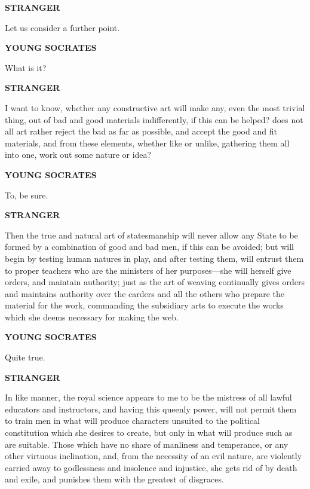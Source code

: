 \documentclass[11pt,letter]{article}
\begin{document}
\par \textbf{STRANGER}
\par   Let us consider a further point.

\par \textbf{YOUNG SOCRATES}
\par   What is it?

\par \textbf{STRANGER}
\par   I want to know, whether any constructive art will make any, even the most trivial thing, out of bad and good materials indifferently, if this can be helped? does not all art rather reject the bad as far as possible, and accept the good and fit materials, and from these elements, whether like or unlike, gathering them all into one, work out some nature or idea?

\par \textbf{YOUNG SOCRATES}
\par   To, be sure.

\par \textbf{STRANGER}
\par   Then the true and natural art of statesmanship will never allow any State to be formed by a combination of good and bad men, if this can be avoided; but will begin by testing human natures in play, and after testing them, will entrust them to proper teachers who are the ministers of her purposes—she will herself give orders, and maintain authority; just as the art of weaving continually gives orders and maintains authority over the carders and all the others who prepare the material for the work, commanding the subsidiary arts to execute the works which she deems necessary for making the web.

\par \textbf{YOUNG SOCRATES}
\par   Quite true.

\par \textbf{STRANGER}
\par   In like manner, the royal science appears to me to be the mistress of all lawful educators and instructors, and having this queenly power, will not permit them to train men in what will produce characters unsuited to the political constitution which she desires to create, but only in what will produce such as are suitable. Those which have no share of manliness and temperance, or any other virtuous inclination, and, from the necessity of an evil nature, are violently carried away to godlessness and insolence and injustice, she gets rid of by death and exile, and punishes them with the greatest of disgraces.
\end{document}
